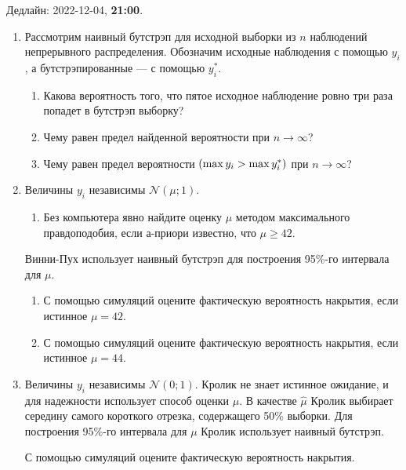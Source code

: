 \documentclass[12pt]{article}
\let\P\relax
\DeclareMathOperator{\P}{\mathbb{P}}
\newcommand \cN{\mathcal{N}}
\begin{document}
Дедлайн: 2022-12-04, \textbf{21:00}.


\begin{enumerate}

\item Рассмотрим наивный бутстрэп для исходной выборки из $n$ наблюдений непрерывного распределения. 
Обозначим исходные наблюдения с помощью $y_i$, а бутстрэпированные — с помощью $y_i^*$.

\begin{enumerate}
    \item Какова вероятность того, что пятое исходное наблюдение ровно три раза попадет в бутстрэп выборку?        
    \item Чему равен предел найденной вероятности при $n\to \infty$?
    \item Чему равен предел вероятности $\P(\max y_i > \max y_i^*)$ при $n\to \infty$?
\end{enumerate}




\item Величины $y_i$ независимы $\cN(\mu;1)$. 
\begin{enumerate}
    \item Без компьютера явно найдите оценку $\mu$  методом максимального правдоподобия,
    если а-приори известно, что $\mu \geq 42$.
    
\end{enumerate}
Винни-Пух использует наивный бутстрэп для построения 95\%-го  интервала для $\mu$. 
\begin{enumerate}[resume]
    \item С помощью симуляций оцените фактическую вероятность накрытия, если истинное $\mu = 42$.
    \item С помощью симуляций оцените фактическую вероятность накрытия, если истинное $\mu = 44$.
\end{enumerate}


\item Величины $y_i$ независимы $\cN(0;1)$. 
Кролик не знает истинное ожидание, и для надежности использует  способ оценки $\mu$. 
В качестве $\hat \mu$ Кролик выбирает середину самого короткого отрезка, содержащего 50\% выборки. 
Для построения 95\%-го интервала для $\mu$ Кролик использует наивный бутстрэп. 

С помощью симуляций оцените фактическую вероятность накрытия.


\end{enumerate}
\end{document}
